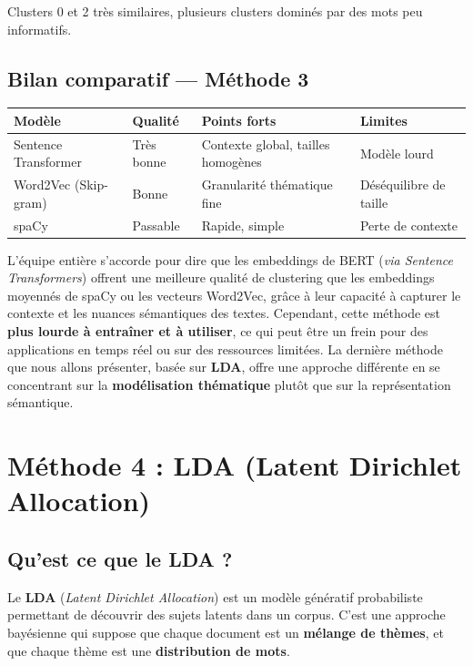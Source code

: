 \documentclass[12pt,a4paper]{report}
\begin{document}
\begin{warn}
Clusters 0 et 2 très similaires, plusieurs clusters dominés par des mots peu informatifs.
\end{warn}

\subsection{Bilan comparatif — Méthode 3}

\begin{center}
\begin{tabular}{@{}llL{4cm}l@{}}
\toprule
\textbf{Modèle} & \textbf{Qualité} & \textbf{Points forts} & \textbf{Limites} \\
\midrule
Sentence Transformer & Très bonne & Contexte global, tailles homogènes & Modèle lourd \\
\midrule
Word2Vec (Skip-gram) & Bonne & Granularité thématique fine & Déséquilibre de taille \\
\midrule
spaCy & Passable & Rapide, simple & Perte de contexte \\
\bottomrule
\end{tabular}
\end{center}

L'équipe entière s'accorde pour dire que les embeddings de BERT (\textit{via Sentence Transformers}) offrent une meilleure qualité de clustering que les embeddings moyennés de spaCy ou les vecteurs Word2Vec,
grâce à leur capacité à capturer le contexte et les nuances sémantiques des textes.
Cependant, cette méthode est \textbf{plus lourde à entraîner et à utiliser}, ce qui peut être un frein pour des applications en temps réel ou sur des ressources limitées.
La dernière méthode que nous allons présenter, basée sur \textbf{LDA}, offre une approche différente en se concentrant sur la \textbf{modélisation thématique} plutôt que sur la représentation sémantique.

\pagebreak

\section{Méthode 4 : LDA (Latent Dirichlet Allocation)}

\subsection{Qu'est ce que le LDA ?}

Le \textbf{LDA} (\textit{Latent Dirichlet Allocation}) est un modèle génératif probabiliste
permettant de découvrir des sujets latents dans un corpus. C'est une approche bayésienne qui
suppose que chaque document est un \textbf{mélange de thèmes}, et que chaque thème est une
\textbf{distribution de mots}.
\end{document}
